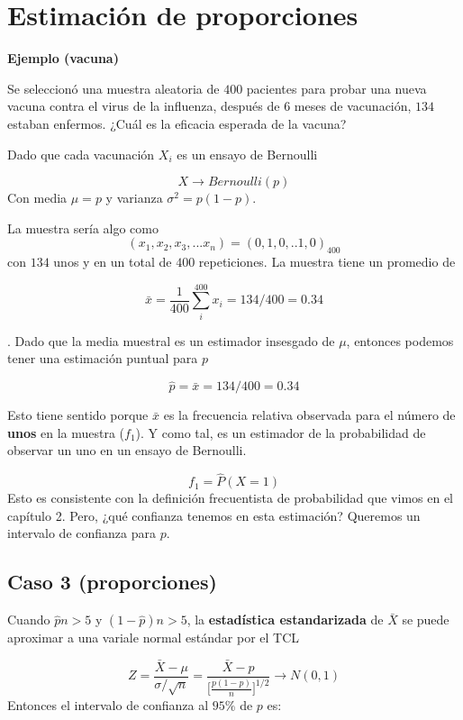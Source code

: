 \documentclass[
]{book}
\begin{document}
\hypertarget{estimaciuxf3n-de-proporciones}{%
\section{Estimación de proporciones}\label{estimaciuxf3n-de-proporciones}}

\textbf{Ejemplo (vacuna)}

Se seleccionó una muestra aleatoria de \(400\) pacientes para probar una nueva vacuna contra el virus de la influenza, después de \(6\) meses de vacunación, \(134\) estaban enfermos. ¿Cuál es la eficacia esperada de la vacuna?

Dado que cada vacunación \(X_i\) es un ensayo de Bernoulli

\[X \rightarrow Bernoulli(p)\]
Con media \(\mu=p\) y varianza \(\sigma^2=p(1-p)\).

La muestra sería algo como
\[(x_1,x_2, x_3, ...x_n)=(0,1,0,.. 1, 0)_{400}\] con \(134\) unos y en un total de \(400\) repeticiones. La muestra tiene un promedio de

\[\bar{x}=\frac{1}{400}\sum_i^{400} x_i=134/400=0.34\]

. Dado que la media muestral es un estimador insesgado de \(\mu\), entonces podemos tener una estimación puntual para \(p\)

\[\hat{p}=\bar{x}=134/400=0.34\]

Esto tiene sentido porque \(\bar{x}\) es la frecuencia relativa observada para el número de \textbf{unos} en la muestra (\(f_1\)). Y como tal, es un estimador de la probabilidad de observar un uno en un ensayo de Bernoulli.

\[f_1 =\hat{P}(X=1)\]
Esto es consistente con la definición frecuentista de probabilidad que vimos en el capítulo 2. Pero, ¿qué confianza tenemos en esta estimación? Queremos un intervalo de confianza para \(p\).

\hypertarget{caso-3-proporciones}{%
\subsection{Caso 3 (proporciones)}\label{caso-3-proporciones}}

Cuando \(\hat{p}n>5\) y \((1-\hat{p})n>5\), la \textbf{estadística estandarizada} de \(\bar{X}\) se puede aproximar a una variale normal estándar por el TCL

\[Z=\frac{\bar{X}-\mu}{\sigma/\sqrt{n}}= \frac{\bar{X}-p}{\big[\frac{p(1-p)}{n} \big]^{1/2}}\rightarrow N(0,1)\]
Entonces el intervalo de confianza al \(95\%\) de \(p\) es:
\end{document}
